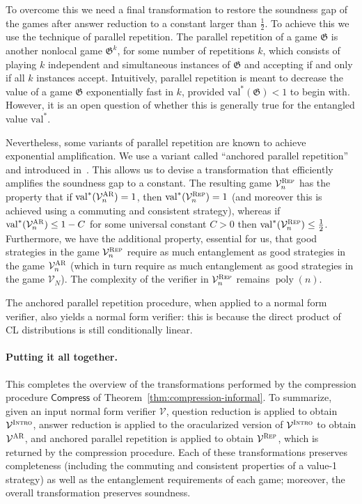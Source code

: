 \documentclass[11pt]{article}
\theoremstyle{definition}
\DeclareMathOperator{\poly}{poly}
\newcommand{\val}{\ensuremath{\mathrm{val}}}
\newcommand{\game}{\mathfrak{G}}
\newcommand{\verifier}{\mathcal{V}}
\newcommand{\gamestyle}[1]{\ensuremath{\textsc{#1}}\xspace}
\newcommand{\ar}{\gamestyle{AR}}
\newcommand{\intro}{\gamestyle{Intro}}
\newcommand{\tmstyle}[1]{\ensuremath{\mathsf{#1}}}
\newcommand{\Compress}{\tmstyle{Compress}}
\newcommand{\rep}{\gamestyle{Rep}}
\begin{document}
To overcome this we need a final transformation to restore the soundness gap of the games after answer reduction to a constant larger than $\frac{1}{2}$. To achieve this we use the technique of {parallel repetition}. The parallel repetition of a game $\game$ is another nonlocal game $\game^k$, for some number of repetitions $k$, which consists of playing $k$ independent and simultaneous instances of $\game$ and accepting if and only if all $k$ instances accept. Intuitively, parallel repetition is meant to decrease the value of a game $\game$ exponentially fast in $k$, provided $\val^*(\game) < 1$ to begin with. However, it is an open question of whether this is generally true for the entangled value $\val^*$. 

Nevertheless, some variants of parallel repetition are known to achieve exponential amplification. We use  a variant  called ``anchored parallel repetition'' and introduced in~\cite{bavarian2017hardness}. This allows us to devise a transformation that efficiently amplifies the soundness gap to a constant. The resulting game $\verifier^\rep_n$ has the property that if $\val^*(\verifier^\ar_n) = 1$, then $\val^*(\verifier^\rep_n) = 1$ (and moreover this is achieved using a commuting and consistent strategy), whereas if $\val^*(\verifier^\ar_n) \leq 1 - C$ for some universal constant $C > 0$ then $\val^*(\verifier^\rep_n) \leq \frac{1}{2}$. Furthermore, we have the additional property, essential for us, that good strategies in the game $\verifier^\rep_n$ require as much entanglement as good strategies in the game $\verifier^\ar_n$ (which in turn require as much entanglement as good strategies in the game $\verifier_N$). The complexity of the verifier in $\verifier^\rep_n$ remains $\poly(n)$.

The anchored parallel repetition procedure, when applied to a normal form verifier, also yields a normal form verifier: this is because the direct product of CL distributions is still conditionally linear. 


\paragraph{Putting it all together.} This completes the overview of the transformations performed by the compression procedure $\Compress$ of Theorem~\ref{thm:compression-informal}. To summarize, given an input normal form verifier $\verifier$, question reduction is applied to obtain $\verifier^\intro$, answer reduction is applied to the oracularized version of $\verifier^\intro$ to obtain $\verifier^\ar$, and  anchored parallel repetition is applied to obtain $\verifier^\rep$, which is returned by the compression procedure. Each of these transformations preserves completeness (including the commuting and consistent properties of a value-1 strategy) as well as the entanglement requirements of each game; moreover, the overall transformation preserves soundness. 
 
\end{document}
